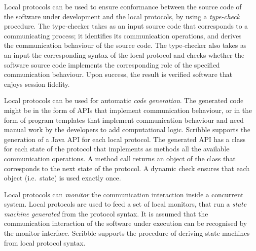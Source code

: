 Local protocols can be used
to ensure
conformance between the source code of the
software under development and the local protocols,
by using a {\em type-check} procedure.
The type-checker takes as an input
source code that corresponds to a communicating process;
it identifies its communication operations,
and derives the communication behaviour of
the
source code.
The type-checker also takes as an input the
corresponding syntax of the local protocol
and checks whether the
software source code
implements the corresponding role of the specified communication behaviour.
Upon success, the result is verified software that
enjoys session fidelity.

Local protocols can be used 
for automatic {\em code generation}. The generated
code might be in the form of APIs that implement
communication behaviour, or in the form of program
templates that implement communication behaviour and
need manual work by the developers to add
computational logic.
Scribble supports the generation of a Java API for
each local protocol. %
The generated API has a class for each state of the protocol
that implements as methods all the available communication
operations. A method call returns an object of the class
that corresponds to the next state of the protocol. A dynamic
check ensures that each object (i.e.~state) is used exactly once.


Local protocols can
{\em monitor} %
the communication
interaction inside a concurrent system.
Local protocols are used to feed a set of local monitors,
that
run a {\em state machine generated}
from the
protocol syntax.
It is assumed that the communication interaction
of the software under execution can be recognised
by the monitor interface.
Scribble supports the procedure of deriving
state machines from local protocol syntax.

